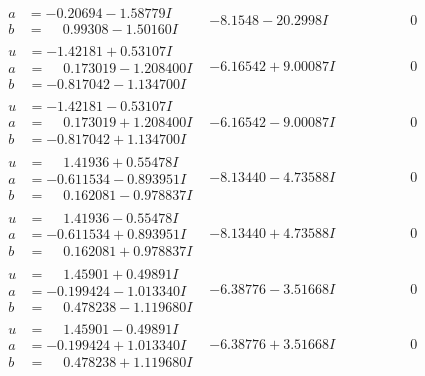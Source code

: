 \documentclass[1p]{elsarticle_modified}
\theoremstyle{definition}
\begin{document}
$$\begin{array}{c|c|c}
\begin{aligned}
a &= -0.20694 - 1.58779 I \\
b &= \phantom{-}0.99308 - 1.50160 I\end{aligned}
 & -8.1548 - 20.2998 I & \phantom{-0.000000 } 0 \\ \hline\begin{aligned}
u &= -1.42181 + 0.53107 I \\
a &= \phantom{-}0.173019 - 1.208400 I \\
b &= -0.817042 - 1.134700 I\end{aligned}
 & -6.16542 + 9.00087 I & \phantom{-0.000000 } 0 \\ \hline\begin{aligned}
u &= -1.42181 - 0.53107 I \\
a &= \phantom{-}0.173019 + 1.208400 I \\
b &= -0.817042 + 1.134700 I\end{aligned}
 & -6.16542 - 9.00087 I & \phantom{-0.000000 } 0 \\ \hline\begin{aligned}
u &= \phantom{-}1.41936 + 0.55478 I \\
a &= -0.611534 - 0.893951 I \\
b &= \phantom{-}0.162081 - 0.978837 I\end{aligned}
 & -8.13440 - 4.73588 I & \phantom{-0.000000 } 0 \\ \hline\begin{aligned}
u &= \phantom{-}1.41936 - 0.55478 I \\
a &= -0.611534 + 0.893951 I \\
b &= \phantom{-}0.162081 + 0.978837 I\end{aligned}
 & -8.13440 + 4.73588 I & \phantom{-0.000000 } 0 \\ \hline\begin{aligned}
u &= \phantom{-}1.45901 + 0.49891 I \\
a &= -0.199424 - 1.013340 I \\
b &= \phantom{-}0.478238 - 1.119680 I\end{aligned}
 & -6.38776 - 3.51668 I & \phantom{-0.000000 } 0 \\ \hline\begin{aligned}
u &= \phantom{-}1.45901 - 0.49891 I \\
a &= -0.199424 + 1.013340 I \\
b &= \phantom{-}0.478238 + 1.119680 I\end{aligned}
 & -6.38776 + 3.51668 I & \phantom{-0.000000 } 0 \\ \hline\begin{aligned}

\end{aligned}
\end{array}$$
\end{document}
